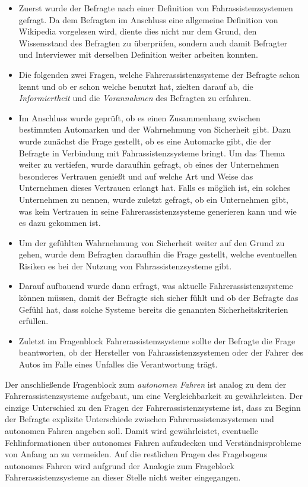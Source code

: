 \documentclass[12pt]{article}
\begin{document}
\begin{itemize}
  \item Zuerst wurde der Befragte nach einer Definition von Fahrassistenzsystemen gefragt. Da dem Befragten im Anschluss eine allgemeine Definition von Wikipedia vorgelesen wird, diente dies nicht nur dem Grund, den Wissensstand des Befragten zu überprüfen, sondern auch damit Befragter und Interviewer mit derselben Definition weiter arbeiten konnten.

  \item Die folgenden zwei Fragen, welche Fahrerassistenzsysteme der Befragte schon kennt und ob er schon welche benutzt hat, zielten darauf ab, die \emph{Informiertheit} und die \emph{Vorannahmen} des Befragten zu erfahren.

  \item Im Anschluss wurde geprüft, ob es einen Zusammenhang zwischen bestimmten Automarken und der Wahrnehmung von Sicherheit gibt. Dazu wurde zunächst die Frage gestellt, ob es eine Automarke gibt, die der Befragte in Verbindung mit Fahrassistenzsysteme bringt. Um das Thema weiter zu vertiefen, wurde daraufhin gefragt, ob eines der Unternehmen besonderes Vertrauen genießt und auf welche Art und Weise das Unternehmen dieses Vertrauen erlangt hat. Falls es möglich ist, ein solches Unternehmen zu nennen, wurde zuletzt gefragt, ob ein Unternehmen gibt, was kein Vertrauen in seine Fahrerassistenzsysteme generieren kann und wie es dazu gekommen ist.

  \item Um der gefühlten Wahrnehmung von Sicherheit weiter auf den Grund zu gehen, wurde dem Befragten daraufhin die Frage gestellt, welche eventuellen Risiken es bei der Nutzung von Fahrassistenzsysteme gibt.

  \item Darauf aufbauend wurde dann erfragt, was aktuelle Fahrerassistenzsysteme können müssen, damit der Befragte sich sicher fühlt und ob der Befragte das Gefühl hat, dass solche Systeme bereits die genannten Sicherheitskriterien erfüllen.

  \item Zuletzt im Fragenblock Fahrerassistenzsysteme sollte der Befragte die Frage beantworten, ob der Hersteller von Fahrassistenzsystemen oder der Fahrer des Autos im Falle eines Unfalles die Verantwortung trägt.
\end{itemize}



Der anschließende Fragenblock zum \emph{autonomen Fahren} ist analog zu dem der Fahrerassistenzsysteme aufgebaut, um eine Vergleichbarkeit zu gewährleisten. Der einzige Unterschied zu den Fragen der Fahrerassistenzsysteme ist, dass zu Beginn der Befragte explizite Unterschiede zwischen Fahrerassistenzsystemen und autonomen Fahren angeben soll. Damit wird gewährleistet, eventuelle Fehlinformationen über autonomes Fahren aufzudecken und Verständnisprobleme von Anfang an zu vermeiden. Auf die restlichen Fragen des Fragebogens autonomes Fahren wird aufgrund der Analogie zum Frageblock Fahrerassistenzsysteme an dieser Stelle nicht weiter eingegangen.
\end{document}
